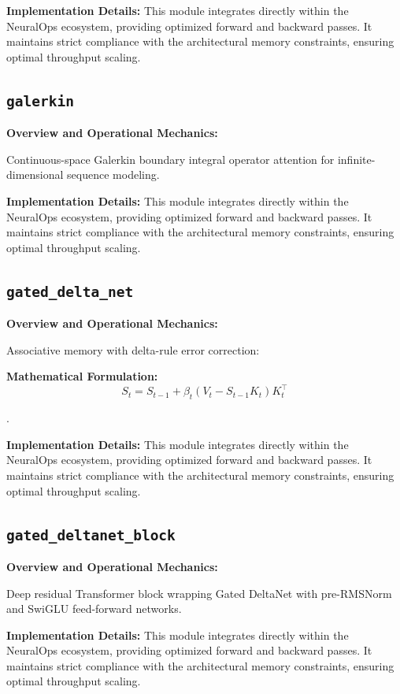 \documentclass[10pt,twocolumn,letterpaper]{article}
\begin{document}
\textbf{Implementation Details:}
This module integrates directly within the NeuralOps ecosystem, providing optimized forward and backward passes. It maintains strict compliance with the architectural memory constraints, ensuring optimal throughput scaling.

\subsection{\texttt{galerkin}}
\textbf{Overview and Operational Mechanics:}

Continuous-space Galerkin boundary integral operator attention for infinite-dimensional sequence modeling.

\textbf{Implementation Details:}
This module integrates directly within the NeuralOps ecosystem, providing optimized forward and backward passes. It maintains strict compliance with the architectural memory constraints, ensuring optimal throughput scaling.

\subsection{\texttt{gated\_delta\_net}}
\textbf{Overview and Operational Mechanics:}

Associative memory with delta-rule error correction:

\textbf{Mathematical Formulation:}
\begin{equation}
S_t = S_{t-1} + \beta_t (V_t - S_{t-1} K_t) K_t^\top
\end{equation}

.

\textbf{Implementation Details:}
This module integrates directly within the NeuralOps ecosystem, providing optimized forward and backward passes. It maintains strict compliance with the architectural memory constraints, ensuring optimal throughput scaling.

\subsection{\texttt{gated\_deltanet\_block}}
\textbf{Overview and Operational Mechanics:}

Deep residual Transformer block wrapping Gated DeltaNet with pre-RMSNorm and SwiGLU feed-forward networks.

\textbf{Implementation Details:}
This module integrates directly within the NeuralOps ecosystem, providing optimized forward and backward passes. It maintains strict compliance with the architectural memory constraints, ensuring optimal throughput scaling.
\end{document}
